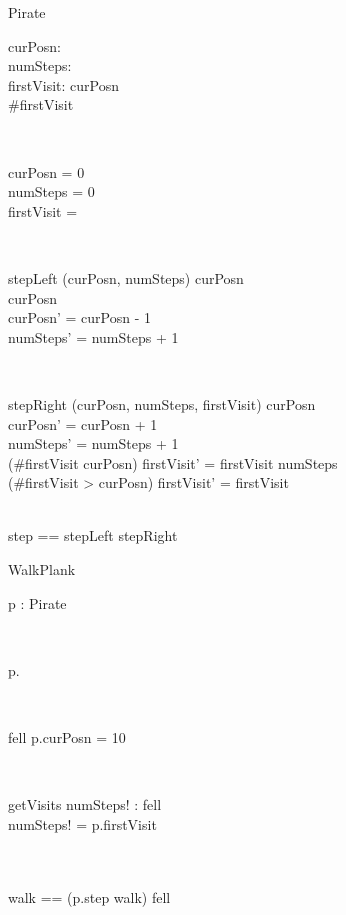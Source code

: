 \documentclass[11pt,a4paper]{article}
\begin{document}
\begin{class}{Pirate}
\also
	\begin{state}
		curPosn: \nat \\
		numSteps: \nat \\
		firstVisit: \seq \nat
	\where
		curPosn  \\
		\#firstVisit 
	\end{state} \\
	\begin{init}
		curPosn = 0 \\
		numSteps = 0 \\
		firstVisit = \langle \rangle
	\end{init} \\
	\begin{schema}{stepLeft}
		\Delta (curPosn, numSteps)
	\where	
	        curPosn  \\
		curPosn \neq 10 \\
		curPosn' = curPosn - 1 \\
		numSteps' = numSteps + 1 \\
	\end{schema} \\
	\begin{schema}{stepRight}
		\Delta (curPosn, numSteps, firstVisit)
	\where
	        curPosn  \\
        	curPosn' = curPosn + 1 \\
	        numSteps' = numSteps + 1 \\
		(\#firstVisit \leq curPosn) \implies firstVisit' = firstVisit \cat
			\langle numSteps \rangle \\
		(\#firstVisit > curPosn) \implies firstVisit' = firstVisit
	\end{schema} \\
	step == stepLeft \gch stepRight
	\end{class}

\begin{class}{WalkPlank}
\also
        \begin{state}
                p : Pirate
        \end{state} \\
	\begin{init}
		p.\Init
	\end{init}\\
	\begin{schema}{fell}
        \where
		p.curPosn = 10
	\end{schema} \\
	\begin{schema}{getVisits}
		numSteps! : \seq \nat
	\where
		fell \\
		numSteps! = p.firstVisit
	\end{schema} \\
	\\
        walk == (p.step \semi walk) \gch fell
\end{class}
\end{document}
